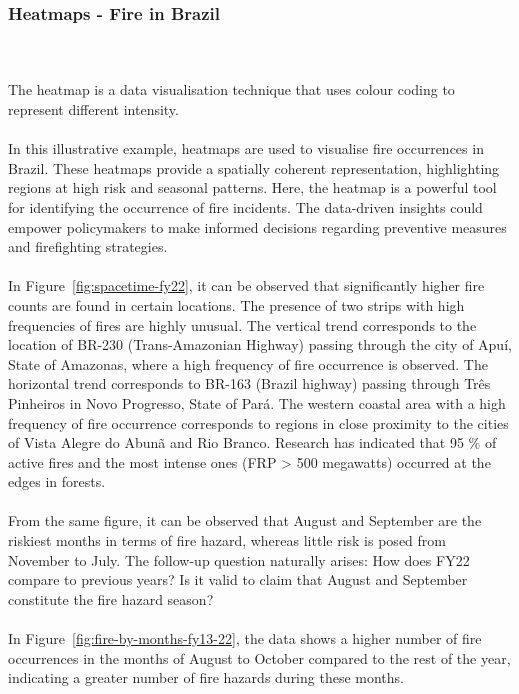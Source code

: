 \documentclass{article}\usepackage[]{graphicx}\usepackage[]{xcolor}
\begin{document}
\subsubsection{Heatmaps - Fire in Brazil}
\\  
\\The heatmap is a data visualisation technique that uses colour coding to represent different intensity.
\\  
\\In this illustrative example, heatmaps are used to visualise fire occurrences in Brazil. These heatmaps provide a spatially coherent representation, highlighting regions at high risk and seasonal patterns. Here, the heatmap is a powerful tool for identifying the occurrence of fire incidents. The data-driven insights could empower policymakers to make informed decisions regarding preventive measures and firefighting strategies.
\\  
\\In Figure~\ref{fig:spacetime-fy22}, it can be observed that significantly higher fire counts are found in certain locations. The presence of two strips with high frequencies of fires are highly unusual.  The vertical trend corresponds to the location of BR-230 (Trans-Amazonian Highway) passing through the city of Apuí, State of Amazonas, where a high frequency of fire occurrence is observed.  The horizontal trend corresponds to BR-163 (Brazil highway) passing through Três Pinheiros in Novo Progresso, State of Pará. The western coastal area with a high frequency of fire occurrence corresponds to regions in close proximity to the cities of Vista Alegre do Abunã and Rio Branco. Research has indicated that 95 \% of active fires and the most intense ones (FRP > 500 megawatts) occurred at the edges in forests.
\\  
\\From the same figure, it can be observed that August and September are the riskiest months in terms of fire hazard, whereas little risk is posed from November to July. The follow-up question naturally arises: How does FY22 compare to previous years? Is it valid to claim that August and September constitute the fire hazard season?
\\    
\\In Figure~\ref{fig:fire-by-months-fy13-22}, the data shows a higher number of fire occurrences in the months of August to October compared to the rest of the year, indicating a greater number of fire hazards during these months.
\\  
\end{document}
